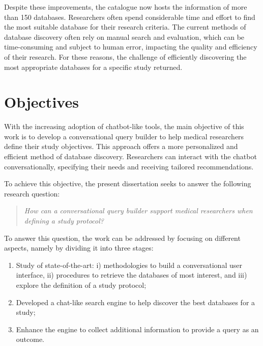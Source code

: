 Despite these improvements, the catalogue now hosts the information of more than 150 databases. Researchers often spend considerable time and effort to find the most suitable database for their research criteria. The current methods of database discovery often rely on manual search and evaluation, which can be time-consuming and subject to human error, impacting the quality and efficiency of their research. For these reasons, the challenge of efficiently discovering the most appropriate databases for a specific study returned. 



\section{Objectives}


With the increasing adoption of chatbot-like tools, the main objective of this work is to develop a conversational query builder to help medical researchers define their study objectives. This approach offers a more personalized and efficient method of database discovery. Researchers can interact with the chatbot conversationally, specifying their needs and receiving tailored recommendations. 

To achieve this objective, the present dissertation seeks to answer the following research question:

\begin{quote}
    \small\textit{How can a conversational query builder support medical researchers when defining a study protocol?}
\end{quote}

To answer this question, the work can be addressed by focusing on different aspects, namely by dividing it into three stages:

\begin{enumerate}
    \item Study of state-of-the-art: i) methodologies to build a conversational user interface, ii) procedures to retrieve the databases of most interest, and iii) explore the definition of a study protocol;
    \item Developed a chat-like search engine to help discover the best databases for a study;
    \item Enhance the engine to collect additional information to provide a query as an outcome. 
\end{enumerate}


